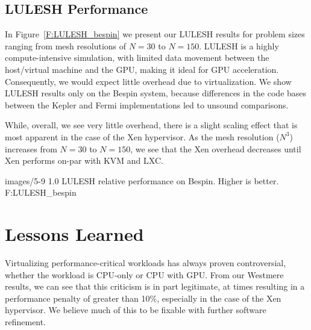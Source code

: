 \subsection{LULESH Performance}

In Figure~\ref{F:LULESH_bespin} we present our LULESH results for problem sizes
ranging from mesh resolutions of $N=30$ to $N=150$.  LULESH is a highly compute-intensive
simulation, with limited data movement between the host/virtual machine and the
GPU, making it ideal for GPU acceleration. Consequently, we would expect
little overhead due to virtualization. We show LULESH results only on the Bespin
system, because differences in the code bases between the Kepler and Fermi
implementations led to unsound comparisons.

While, overall, we see very little overhead, there is a
slight scaling effect that is most apparent in the case of the Xen hypervisor.
As the mesh resolution ($N^3$) increases from $N=30$ to $N=150$, we see that the Xen
overhead decreases until Xen performs on-par with
KVM and LXC.  


  {images/5-9}
  {1.0}
  {LULESH relative performance on Bespin. Higher is better.}
  {F:LULESH_bespin} 



\section{Lessons Learned}\label{LESSONS}

Virtualizing performance-critical workloads has always proven controversial,
whether the workload is CPU-only \cite{Younge2011cloud} or CPU with GPU.  From our Westmere results, we
can see that this criticism is in part legitimate, at times resulting in a performance
penalty of greater than 10\%, especially in the case of the Xen
hypervisor.  We believe much of this to be fixable with further software refinement.


